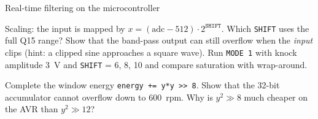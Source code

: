 \begin{exercise}{Real-time filtering on the microcontroller}{\Wokwi}
\begin{tasks}
\begin{tasks}
      \item Scaling: the input is mapped by $x=(\text{adc}-512)\cdot2^{\texttt{SHIFT}}$.
        Which \texttt{SHIFT} uses the full Q15 range? Show that the band-pass
        output can still overflow when the \emph{input} clips (hint: a clipped
        sine approaches a square wave). Run \texttt{MODE 1} with knock amplitude
        \SI{3}{V} and \texttt{SHIFT} = 6, 8, 10 and compare saturation with
        wrap-around.
      \item Complete the window energy \texttt{energy += y*y >> 8}. Show that the
        32-bit accumulator cannot overflow down to \SI{600}{rpm}. Why is
        $y^2\gg 8$ much cheaper on the AVR than $y^2\gg 12$?
    \end{tasks}
\end{tasks}
\end{exercise}

